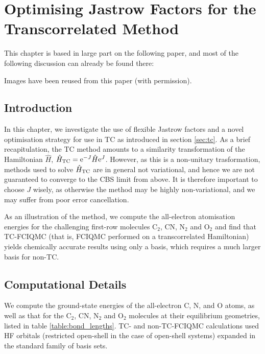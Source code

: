 \chapter{Optimising Jastrow Factors for the Transcorrelated Method}
  \label{chap:opt}

This chapter is based in large part on the following paper, and most of the following discussion can already be found there:\\

Images have been reused from this paper (with permission).

\section{Introduction}

In this chapter, we investigate the use of flexible Jastrow factors and a novel optimisation strategy for use in \gls{TC} as introduced in section \ref{sec:tc}. As a brief recapitulation, the TC method amounts to a similarity transformation of the Hamiltonian $\hat H$, $\hat H_\mathrm{TC} = \mathrm{e}^{-J}\hat H\mathrm{e}^J$. However, as this is a non-unitary trasformation, methods used to solve $\hat H_\mathrm{TC}$ are in general not variational, and hence we are not guaranteed to converge to the \gls{CBS} limit from above. It is therefore important to choose $J$ wisely, as otherwise the method may be highly non-variational, and we may suffer from poor error cancellation.

As an illustration of the method, we compute the all-electron atomisation energies for the challenging first-row molecules C$_2$, CN, N$_2$ and O$_2$ and find that \gls{TC}-\gls{FCIQMC} (that is, \gls{FCIQMC} performed on a transcorrelated Hamiltonian) yields chemically accurate results using only a \vtz basis, which requires a much larger  basis for non-TC.

\section{Computational Details}
We compute the ground-state energies of the all-electron C, N, and O atoms, as well as that for the C$_2$, CN, N$_2$ and O$_2$ molecules at their equilibrium geometries,\supercite{fellerSurvey2008,bytautasCorrelation2005,hardingHighaccuracy2008} listed in table
\ref{table:bond_lengths}.
TC- and non-TC-FCIQMC calculations used \gls{HF} orbitals (restricted open-shell in the case of open-shell systems) expanded in the standard  family of basis sets.\supercite{dunningGaussian1989a}


